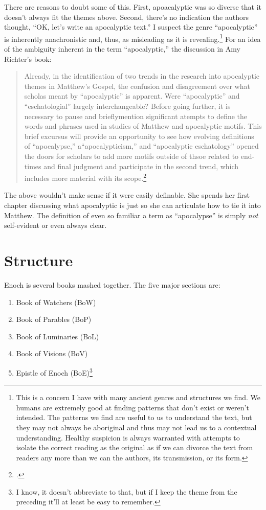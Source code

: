 \documentclass{article}
\begin{document}
There are reasons to doubt some of this.
First, apoacalyptic was so diverse that it doesn't always fit the themes above.
Second, there's no indication the authors thought, ``OK, let's write an apocalyptic text.''
I suspect the genre ``apocalyptic'' is inherently anachronistic and, thus, as misleading as it is revealing.\footnote{
  This is a concern I have with many ancient genres and structures we find.
  We humans are extremely good at finding patterns that don't exist or weren't intended.
  The patterns we find are useful to us to understand the text, but they may not always be aboriginal and thus may not lead us to a contextual understanding.
  Healthy suspicion is always warranted with attempts to isolate the correct reading as the original as if we can divorce the text from readers any more than we can the authors, its transmission, or its form.
}
For an idea of the ambiguity inherent in the term ``apocalyptic,'' the discussion in Amy Richter's book:
\begin{quote}
  Already, in the identification of two trends in the research into apocalyptic themes in Matthew's Gospel, the confusion and disagreement over what scholas meant by ``apocalyptic'' is apparent.
  Were ``apocalyptic'' and ``eschatologial'' largely interchangeable?
  Before going further, it is necessary to pause and brieflymention significant atempts to define the words and phrases used in studies of Matthew and apocalyptic motifs.
  This brief excursus will provide an opportunity to see how evolving definitions of ``apocalypse,'' a``apocalypticism,'' and ``apocalyptic eschatology'' opened the doors for scholars to add more motifs outside of thsoe related to end-times and final judgment and participate in the second trend, which includes more material with its scope.\footcite[280]{Richter2012}
\end{quote}
The above wouldn't make sense if it were easily definable.
She spends her first chapter discussing what apocalyptic is just so she can articulate how to tie it into Matthew.
The definition of even so familiar a term as ``apocalypse'' is simply \emph{not} self-evident or even always clear.


\section{Structure}

Enoch is several books mashed together.
The five major sections are:
\begin{enumerate}
  \item Book of Watchers (BoW)
  \item Book of Parables (BoP)
  \item Book of Luminaries (BoL)
  \item Book of Visions (BoV)
  \item Epistle of Enoch (BoE)\footnote{
	  I know, it doesn't abbreviate to that, but if I keep the theme from the preceding it'll at least be easy to remember.
	  }
\end{enumerate}
\end{document}
